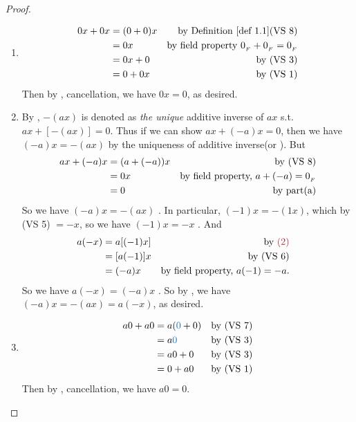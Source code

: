 \begin{proof}
\begin{enumerate}
\item
    \begin{align*}
        0x + 0x & = (0 + 0)x & \text{by \DEF{1.1}(VS 8)} \\
                & = 0x & \text{by field property \(\OF + \OF = \OF\)} \\
                & = 0x + 0 & \text{by (VS 3)} \\
                & = 0 + 0x & \text{by (VS 1)}
    \end{align*}
    Then by , cancellation, we have \(0x = 0\), as desired.
\item
    By , \(-(ax)\) is denoted as \emph{the unique} additive inverse of \(ax\) s.t. \(ax + [-(ax)] = 0\).
    Thus if we can show \(ax + (-a)x = 0\), then we have \((-a)x = -(ax)\) by the uniqueness of additive inverse(or ).
    But
    \begin{align*}
        ax + (-a)x & = (a + (-a))x & \text{by (VS 8)} \\
                   & = 0x & \text{by field property, \(a + (-a) = 0_{_F}\)} \\
                   & = 0 & \text{by part(a)}
    \end{align*}
    So we have \((-a)x = -(ax)\) .
    In particular, \((-1) x = -(1x)\), which by (VS 5) \(= -x\), so we have \((-1)x = -x\) .
    And
    \begin{align*}
        a(-x) & = a[(-1)x] & \text{by \MAROON{(2)}} \\
              & = [a(-1)]x & \text{by (VS 6)} & \\
              & = (-a)x & \text{by field property, \(a(-1) = -a\)}.
    \end{align*}
    So we have \(a(-x) = (-a)x\) .
    So by , we have \((-a)x = -(ax) = a(-x)\), as desired.
\item
    \begin{align*}
        a0 + a0 & = a(\BLUE{0} + 0) & \text{by (VS 7)} \\
                & = a\BLUE{0} & \text{by (VS 3)} \\
                & = a0 + 0 & \text{by (VS 3)} \\
                & = 0 + a0 & \text{by (VS 1)}
    \end{align*}
    Then by , cancellation, we have \(a0 = 0\).
\end{enumerate}
\end{proof}

